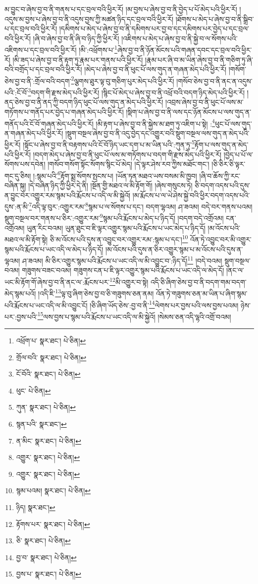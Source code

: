 མ་བྱུང་བ་ཞེས་བྱ་བ་ནི་གནས་པ་དང་བྲལ་བའི་ཕྱིར་རོ། །མ་བྱས་པ་ཞེས་བྱ་བ་ནི་བྱེད་པ་པོ་མེད་པའི་ཕྱིར་རོ། །འདུས་མ་བྱས་པ་ཞེས་བྱ་བ་ནི་འདུས་བྱས་ཀྱི་མཚན་ཉིད་དང་བྲལ་བའི་ཕྱིར་རོ། །ཐོགས་པ་མེད་པ་ཞེས་བྱ་བ་ནི་སྒྲིབ་པ་དང་བྲལ་བའི་ཕྱིར་རོ། །དམིགས་པ་མེད་པ་ཞེས་བྱ་བ་ནི་དམིགས་པར་བྱ་བ་དང་དམིགས་པར་བྱེད་པ་དང་བྲལ་བའི་ཕྱིར་རོ། །ཞི་བ་ཞེས་བྱ་བ་ནི་ཞི་བ་ཉིད་ཀྱི་ཕྱིར་རོ། །འཇིགས་པ་མེད་པ་ཞེས་བྱ་བ་ནི་སྐྱེ་བ་ལ་སོགས་པའི་འཇིགས་པ་དང་བྲལ་བའི་ཕྱིར་རོ། །མི་:འཕྲོགས་པ་\footnote{འཕྲོག་པ་  སྣར་ཐང་།  པེ་ཅིན། }ཞེས་བྱ་བ་ནི་ཉོན་མོངས་པའི་གཞན་དབང་དང་བྲལ་བའི་ཕྱིར་རོ། །མི་ཟད་པ་ཞེས་བྱ་བ་ནི་རྟག་ཏུ་རྣམ་པར་གནས་པའི་ཕྱིར་རོ། །རྣམ་པར་ཞི་བ་མ་ཡིན་ཞེས་བྱ་བ་ནི་གཅིག་ཏུ་ཞི་བའི་བགྲོད་པ་དང་བྲལ་བའི་ཕྱིར་རོ། །མེད་པ་ཞེས་བྱ་བ་ནི་ཕུང་པོ་ལས་གུད་ན་གཞན་མེད་པའི་ཕྱིར་རོ། །གསོག་ཅེས་བྱ་བ་ནི་:གྲོལ་བའི་བདག་\footnote{གྲོལ་བའི་  སྣར་ཐང་།  པེ་ཅིན། }ལྕགས་ཐུར་ལྟ་བུ་གཅིག་པུར་མེད་པའི་ཕྱིར་རོ། །གསོབ་ཅེས་བྱ་བ་ནི་ནང་ན་འདུས་པའི་:ངོ་བོ་\footnote{ངོ་བོའི་  སྣར་ཐང་།  པེ་ཅིན། }བདག་གི་རྫས་མེད་པའི་ཕྱིར་རོ། །སྙིང་པོ་མེད་པ་ཞེས་བྱ་བ་ནི་འཕྲོ་བའི་བདག་ཉིད་མེད་པའི་ཕྱིར་རོ། །ནད་ཅེས་བྱ་བ་ནི་ནད་ཀྱི་བདག་ཉིད་ཕུང་པོ་ལས་གུད་ན་མེད་པའི་ཕྱིར་རོ། །འབྲས་ཞེས་བྱ་བ་ནི་ཕུང་པོ་ལས་མ་གཏོགས་པ་གནོད་པར་བྱེད་པ་གཞན་མེད་པའི་ཕྱིར་རོ། །སྡིག་པ་ཞེས་བྱ་བ་ནི་ལས་དང་ཉོན་མོངས་པ་ལས་གུད་ན་གནོད་པའི་ངོ་བོ་གཞན་མེད་པའི་ཕྱིར་རོ། །མི་རྟག་པ་ཞེས་བྱ་བ་ནི་སྐྱེས་མ་ཐག་ཏུ་འཇིག་པ་སྟེ། :\footnote{ཕུང་  པེ་ཅིན། }ཕུང་པོ་ལས་གུད་ན་གཞན་མེད་པའི་ཕྱིར་རོ། །སྡུག་བསྔལ་ཞེས་བྱ་བ་ནི་འདུ་བྱེད་དང་འགྱུར་བའི་སྡུག་བསྔལ་ལས་གུད་ན་མེད་པའི་ཕྱིར་རོ། །སྟོང་པ་ཞེས་བྱ་བ་ནི་བརྟགས་པའི་ངོ་བོ་ཉིད་ཡང་དག་པ་མ་ཡིན་པའི་:ཀུན་ཏུ་\footnote{ཀུན་  སྣར་ཐང་།  པེ་ཅིན། }རྟོག་པ་ལས་གུད་ན་མེད་པའི་ཕྱིར་རོ། །བདག་མེད་པ་ཞེས་བྱ་བ་ནི་ཕུང་པོ་ལས་མ་གཏོགས་པ་བདག་གི་རྫས་མེད་པའི་ཕྱིར་རོ། །བྱེད་པ་པོ་ལ་སོགས་པས་དབེན། །གསོབ་གསོག་སྟོང་སོགས་སྙིང་པོ་མེད། །དེ་ལྟར་ཤེས་རབ་ཀྱིས་མཐོང་གང་། །ཅི་ཅིར་ཅི་ལྟར་གང་དུ་ཅིས། །:སྙམ་པའི་\footnote{སྙན་པའི་  སྣར་ཐང་། }རྟོག་སྨྲ་སོགས་སྤངས་པ། །ཡོན་ཏན་མཐའ་ཡས་བསམ་མི་ཁྱབ། །ཞི་བ་ཆོས་ཀྱི་རང་བཞིན་སྐུ། །དེ་བཞིན་ཉིད་ཀྱི་ཕྱིར་དེ་ནི། །སྔོན་གྱི་མཐའ་ལ་མི་རྟོག་གོ། །ཞེས་གསུངས་ཏེ། ཅི་བདག་འདས་པའི་དུས་ན་བྱུང་བར་འགྱུར་རམ་སྙམ་པའི་རྨོངས་པ་འདི་ལ་མི་སྐྱེའོ། །མ་རྨོངས་པ་ལ་ཡེ་ཤེས་སྐྱེ་བའི་ཕྱིར་བདག་འདས་པའི་དུས་:ན་མི་\footnote{ན་མིང་  སྣར་ཐང་།  པེ་ཅིན། }འདི་ལྟ་བུར་:འགྱུར་རམ་\footnote{འགྱུར་  སྣར་ཐང་།  པེ་ཅིན། }སྙམ་པ་ལ་སོགས་པ་དང་། བདག་ལྷའམ། ཤ་ཟའམ། བདེ་བར་གནས་པའམ། སྡུག་བསྔལ་བར་གནས་པ་ཅིར་:འགྱུར་རམ་\footnote{འགྱུར་  སྣར་ཐང་།  པེ་ཅིན། }སྙམ་པའི་རྨོངས་པ་མེད་པ་ཉིད་དོ། །བདག་བདེ་འགྲོའམ། ངན་འགྲོའམ། ཡུན་རིང་བའམ། ཡུན་ཐུང་བ་ཇི་ལྟར་འགྱུར་སྙམ་པའི་རྨོངས་པ་ཡང་མེད་པ་ཉིད་དོ། །མ་འོངས་པའི་མཐའ་ལ་མི་རྟོག་སྟེ། ཅི་མ་འོངས་པའི་དུས་ན་འབྱུང་བར་འགྱུར་རམ་:སྙམ་པ་དང་།\footnote{སྙམ་པའམ།  སྣར་ཐང་།  པེ་ཅིན། } འོན་ཏེ་འབྱུང་བར་མི་འགྱུར་སྙམ་པའི་རྨོངས་པ་ཡང་འདི་ལ་མེད་པ་ཉིད་དོ། །མ་འོངས་པའི་དུས་ན་ཅིར་འགྱུར་སྙམ་པ་མ་འོངས་པའི་དུས་ན་ལྷའམ། ཤ་ཟའམ། མི་ཅིར་འགྱུར་སྙམ་པའི་རྨོངས་པ་ཡང་འདི་ལ་མི་འབྱུང་བ་:ཉིད་དོ།\footnote{ཉིད།  སྣར་ཐང་། } །བདེ་བའམ། སྡུག་བསྔལ་བའམ། གཟུགས་བཟང་བའམ། གཟུགས་ངན་པ་ཇི་ལྟར་འགྱུར་སྙམ་པའི་རྨོངས་པ་ཡང་འདི་ལ་མེད་དོ། །ནང་ལ་ཡང་མི་རྟོག་གོ་ཞེས་བྱ་བ་ནི་ནང་ལ་:རྨོངས་པར་\footnote{རྟོགས་པར་  སྣར་ཐང་།  པེ་ཅིན། }མི་འགྱུར་བ་སྟེ། འདི་ཅི་ཞིག་ཅེས་བྱ་བ་ནི་བདག་གམ་བདག་མེད་སྙམ་པའོ། །འདི་ཇི་\footnote{ཅི་  སྣར་ཐང་།  པེ་ཅིན། }ལྟ་བུ་ཞིག་ཅེས་བྱ་བ་ཅི་གཟུགས་ཅན་ནམ། འོན་ཏེ་གཟུགས་ཅན་མ་ཡིན་པ་ཞིག་སྙམ་པའི་རྨོངས་པ་ཡང་འདི་ལ་མི་འབྱུང་ངོ། །ཅི་ཞིག་ཡོད་ཅེས་:བྱ་བ་ནི་\footnote{བྱ་བ་  སྣར་ཐང་།  པེ་ཅིན། }ལེགས་པར་བྱས་པའི་ལས་བྱས་པའམ། ཉེས་པར་:བྱས་པའི་\footnote{བྱས་པ་  སྣར་ཐང་།  པེ་ཅིན། }ལས་བྱས་པ་སྙམ་པའི་རྨོངས་པ་ཡང་འདི་ལ་མི་སྐྱེའོ། །སེམས་ཅན་འདི་ལྷའི་འགྲོ་བའམ། 